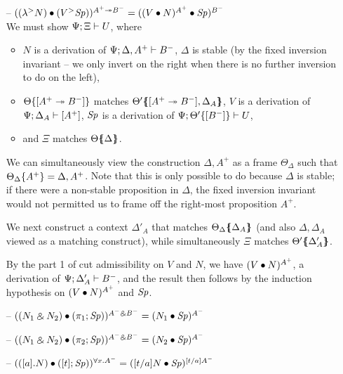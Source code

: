 \begin{itemize}
\item[--] $({({\lambda}^{>}{N})} \bullet {({V}{^{>}}{{\it Sp}})})^{A^+ \twoheadrightarrow B^-} 
           = ({({V} \bullet {N})^{A^+}} \bullet {{\it Sp}})^{B^-}$\smallskip\\
  We must show ${\Psi};{\Xi} \vdash {U}$, where
  \begin{itemize}
  \item $N$ is a derivation of 
     ${\Psi};{{\Delta},{A^+}} \vdash {B^-}$, $\Delta$ is stable (by the fixed
     inversion invariant -- we only invert on the right when there is 
     no further inversion to do on the left), 
  \item ${\Theta}\{{[A^+ \twoheadrightarrow B^-]}\}$ matches 
     ${\Theta'}\mbox{$\{\hspace{-4pt}\{$}{{[A^+ \twoheadrightarrow B^-]},{\Delta_A}}\mbox{$\}\hspace{-4pt}\}$}$, 
     $V$ is a derivation of ${\Psi};{\Delta_A} \vdash {[A^+]}$,
     ${\it Sp}$ is a derivation of ${\Psi};{{\Theta'}\{{[B^-]}\}} \vdash {U}$,
  \item and $\Xi$ matches ${\Theta}\mbox{$\{\hspace{-4pt}\{$}{\Delta}\mbox{$\}\hspace{-4pt}\}$}$.
  \end{itemize}
  We can simultaneously view the construction $\Delta,A^+$ as a frame
  $\Theta_\Delta$ such that ${\Theta_\Delta}\{{A^+}\} =
  \Delta,A^+$.  Note that this is only possible to do because $\Delta$
  is stable; if there were a non-stable proposition in $\Delta$, the
  fixed inversion invariant would not permitted us to frame off the
  right-most proposition $A^+$.

  We next construct a context $\Delta'_A$ that matches
  ${\Theta_\Delta}\mbox{$\{\hspace{-4pt}\{$}{\Delta_A}\mbox{$\}\hspace{-4pt}\}$}$ (and also $\Delta, \Delta_A$ viewed
  as a matching construct), while simultaneously
  $\Xi$ matches ${\Theta'}\mbox{$\{\hspace{-4pt}\{$}{\Delta'_A}\mbox{$\}\hspace{-4pt}\}$}$. 

  By the part 1 of cut admissibility
  on $V$ and $N$, we have $({V} \bullet {N})^{A^+}$, a derivation of 
  ${\Psi};{\Delta'_A} \vdash {B^-}$, and 
  the result then follows by the induction hypothesis on 
  $({V} \bullet {N})^{A^+}$ and ${\it Sp}$.  \smallskip

\item[--] $({({N_1} \mathbin{\binampersand} {N_2})} \bullet {(\pi_1;{{\it Sp}})})^{A^- \mathbin{\binampersand} B^-}
           = ({N_1} \bullet {{\it Sp}})^{A^-}$

\item[--] $({({N_1} \mathbin{\binampersand} {N_2})} \bullet {(\pi_2;{{\it Sp}})})^{A^- \mathbin{\binampersand} B^-}
           = ({N_2} \bullet {{\it Sp}})^{A^-}$

\item[--] $({([{a}].{N})} \bullet {([{t}]; {{\it Sp}})})^{\forall x.A^-}
           = ({[t/a]N} \bullet {{\it Sp}})^{[t/a]A^-}$
\end{itemize}

